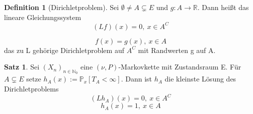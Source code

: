 \documentclass[a4paper,12pt]{scrartcl}
\theoremstyle{definition}
\newtheorem{sat}{Satz}[section]
\newtheorem{defi}{Definition}[section]
\begin{document}
\begin{defi}[Dirichletproblem]
Sei $\emptyset \neq A \subsetneq E$ und $g: A \to \mathbb{R}$. Dann heißt das lineare Gleichungssystem 
\begin{equation*}
(Lf)(x) = 0, \: x \in A^{C}
\end{equation*}

 \begin{equation*}
f(x) = g(x), \: x \in A
\end{equation*}
\noindent
das zu L gehörige Dirichletproblem auf $A^{C}$ mit Randwerten g auf A.     
\end{defi}
\begin{sat}
\label{Dirichletsatz}
Sei $(X_{n})_{n \in \mathbb{N}_{0}}$ eine $(\nu,P)$-Markovkette mit Zustandsraum E. Für $A \subsetneq E$ setze $h_{A}(x) := \mathbb{P}_{x}[T_{A} < \infty] $. Dann ist $h_{A}$ die kleinste Lösung des Dirichletproblems
\begin{equation*}
(Lh_{A})(x) = 0, \: x \in A^{C}
\end{equation*}
\begin{equation*}
h_{A}(x) = 1, \: x \in A
\end{equation*}
\end{sat}
\end{document}
